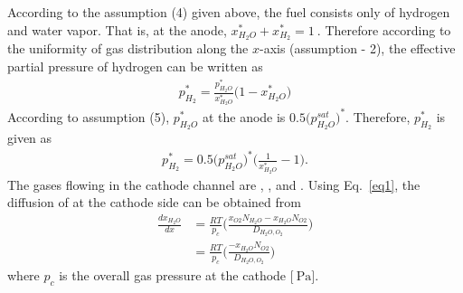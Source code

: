 \documentclass[12pt,a4paper]{scrartcl}
\begin{document}
\begin{onehalfspace}
According to the assumption (4) given above, the fuel consists only of hydrogen and water vapor. That is, at the anode, $x_{H_2O}^*+x_{H_2}^*=\SI{1}{}$. Therefore according to the uniformity of gas distribution along the $x$-axis (assumption - 2), the effective partial pressure of hydrogen  can be written as
\begin{equation}\label{eq5}
	\begin{aligned}
		p_{H_2}^* = \frac{p_{H_2O}^*}{x_{H_2O}^*} \Big(1-x_{H_2O}^*\Big)
	\end{aligned}
\end{equation}
According to assumption (5), $p_{H_2O}^*$ at the anode is $0.5\Big(p_{H_2O}^{sat}\Big)^*$. Therefore, $p_{H_2}^*$ is given as
\begin{equation}\label{eq6}
	\begin{aligned}
		p_{H_2}^* = 0.5\Big(p_{H_2O}^{sat}\Big)^* \Big(\frac{1}{x_{H_2O}^*}-1\Big).
	\end{aligned}
\end{equation}
The gases flowing in the cathode channel are , ,  and . Using Eq.~\eqref{eq1}, the diffusion of  at the cathode side can be obtained from 
\begin{equation}\label{eq7}
	\begin{aligned}
		\frac{dx_{H_2O}}{dx}&=\frac{RT}{p_c}\Bigg(\frac{x_{O2}N_{H_2O}-x_{H_2O}N_{O2}}{D_{H_2O,O_2}}\Bigg) \\[6pt]
		&= \frac{RT}{p_c}\Bigg(\frac{-x_{H_2O}N_{O2}}{D_{H_2O,O_2}}\Bigg)
	\end{aligned}
\end{equation}
where $p_c$ is the overall gas pressure at the cathode $\Big[\SI{}{\pascal}\Big]$.


\end{onehalfspace}
\end{document}
